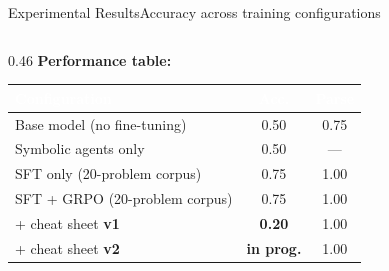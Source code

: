 \documentclass[aspectratio=169,10pt]{beamer}
\newcommand{\cy}[1]{\textcolor{AccentBlue}{\textbf{#1}}}
\begin{document}
\begin{frame}{Experimental Results}{Accuracy across training configurations}
\begin{columns}[T,onlytextwidth]
  \begin{column}{0.46\textwidth}
    \vspace{4mm}
    \cy{Performance table:}
    \vspace{3mm}

    \setlength\arrayrulewidth{0.3pt}
    \begin{tabular*}{\linewidth}{@{\extracolsep{\fill}}lcc}
      \toprule
      \rowcolor{BannerDark}
      \textcolor{white}{\textbf{Configuration}} &
      \textcolor{white}{\textbf{Acc.}} &
      \textcolor{white}{\textbf{Parse}} \\
      \midrule
      \rowcolor{BoxBg}
      Base model (no fine-tuning)    & 0.50 & 0.75 \\
      Symbolic agents only           & 0.50 & ---  \\
      \rowcolor{BoxBg}
      SFT only (20-problem corpus)   & 0.75 & 1.00 \\
      SFT + GRPO (20-problem corpus) & 0.75 & 1.00 \\
      \rowcolor{AccentRed!15}
      + cheat sheet \textbf{v1}
        & \textcolor{AccentRed}{\textbf{0.20}} & 1.00 \\
      \rowcolor{AccentGreen!15}
      + cheat sheet \textbf{v2}
        & \textcolor{AccentGreen}{\textbf{in prog.}} & 1.00 \\
      \bottomrule
    \end{tabular*}


\end{column}
\end{columns}
\end{frame}
\end{document}
